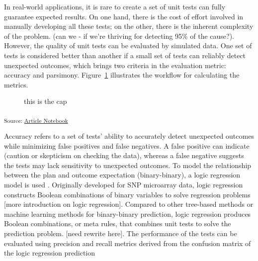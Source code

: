 \documentclass[
]{jds}
\begin{document}
In real-world applications, it is rare to create a set of unit tests can
fully guarantee expected results. On one hand, there is the cost of
effort involved in manually developing all these tests; on the other,
there is the inherent complexity of the problem. (can we - if we're
thriving for detecting 95\% of the cause?). However, the quality of unit
tests can be evaluated by simulated data. One set of tests is considered
better than another if a small set of tests can reliably detect
unexpected outcomes, which brings two criteria in the evaluation metric:
accuracy and parsimony. Figure~\ref{fig-metric-calc} illustrates the
workflow for calculating the metrics.

\label{cell-fig-metric-calc}
\begin{figure}[H]


\caption{\label{fig-metric-calc}this is the cap}

\end{figure}%

\textsubscript{Source:
\href{https://huizezhang-sherry.github.io/paper-analysis-plan/index.qmd.html}{Article
Notebook}}

Accuracy refers to a set of tests' ability to accurately detect
unexpected outcomes while minimizing false positives and false
negatives. A false positive can indicate (caution or skepticism on
checking the data), whereas a false negative suggests the tests may lack
sensitivity to unexpected outcomes. To model the relationship between
the plan and outcome expectation (binary-binary), a logic regression
model is used \citep{ruczinski_logic_2003}. Originally developed for SNP
microarray data, logic regression constructs Boolean combinations of
binary variables to solve regression problems {[}more introduction on
logic regression{]}. Compared to other tree-based methods or machine
learning methods for binary-binary prediction, logic regression produces
Boolean combinations, or meta rules, that combines unit tests to solve
the prediction problem. {[}need rewrite here{]}. The performance of the
tests can be evaluated using precision and recall metrics derived from
the confusion matrix of the logic regression prediction
\end{document}

